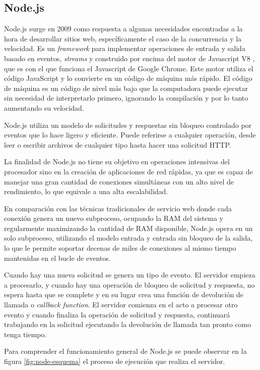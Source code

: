 \subsection{Node.js}

Node.js surge en 2009 como respuesta a algunas necesidades encontradas a la hora de desarrollar sitios web, específicamente el caso de la concurrencia y la velocidad.  Es un \textit{framework} para implementar operaciones de entrada y salida basado en eventos, \textit{streams} y construido por encima del motor de Javascript V8 \citep{WEBSITE:21}, que es con el que funciona el Javascript de Google Chrome. Este motor utiliza el código JavaScript y lo convierte en un código de máquina más rápido. El código de máquina es un código de nivel más bajo que la computadora puede ejecutar sin necesidad de interpretarlo primero, ignorando la compilación y por lo tanto aumentando su velocidad. 

Node.js utiliza un modelo de solicitudes y respuestas sin bloqueo controlado por eventos que lo hace ligero y eficiente. Puede referirse a cualquier operación, desde leer o escribir archivos de cualquier tipo hasta hacer una solicitud HTTP. 

La finalidad de Node.js no tiene su objetivo en operaciones intensivas del procesador sino en la creación de aplicaciones de red rápidas, ya que es capaz de manejar una gran cantidad de conexiones simultáneas con un alto nivel de rendimiento, lo que equivale a una alta escalabilidad. 

En comparación con las técnicas tradicionales de servicio web donde cada conexión genera un nuevo subproceso, ocupando la RAM del sistema y regularmente maximizando la cantidad de RAM disponible, Node.js opera en un solo subproceso, utilizando el modelo entrada y entrada sin bloqueo de la salida, lo que le permite soportar decenas de miles de conexiones al mismo tiempo mantenidas en el bucle de eventos.

Cuando hay una nueva solicitud se genera un tipo de evento. El servidor empieza a procesarlo, y cuando hay una operación de bloqueo de solicitud y respuesta, no espera hasta que se complete y en su lugar crea una función de devolución de llamada o \textit{callback function}. El servidor comienza en el acto a procesar otro evento y cuando finaliza la operación de solicitud y respuesta, continuará trabajando en la solicitud ejecutando la devolución de llamada tan pronto como tenga tiempo. 

Para comprender el funcionamiento general de Node.js se puede observar en la figura \ref{fig:node-esquema} el proceso de ejecución que realiza el servidor.

